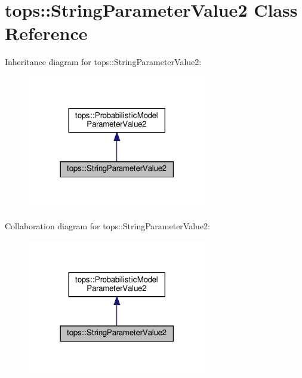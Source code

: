 \hypertarget{classtops_1_1StringParameterValue2}{}\section{tops\+:\+:String\+Parameter\+Value2 Class Reference}
\label{classtops_1_1StringParameterValue2}


Inheritance diagram for tops\+:\+:String\+Parameter\+Value2\+:
\nopagebreak
\begin{figure}[H]
\begin{center}
\leavevmode
\includegraphics[width=222pt]{classtops_1_1StringParameterValue2__inherit__graph}
\end{center}
\end{figure}


Collaboration diagram for tops\+:\+:String\+Parameter\+Value2\+:
\nopagebreak
\begin{figure}[H]
\begin{center}
\leavevmode
\includegraphics[width=222pt]{classtops_1_1StringParameterValue2__coll__graph}
\end{center}
\end{figure}
